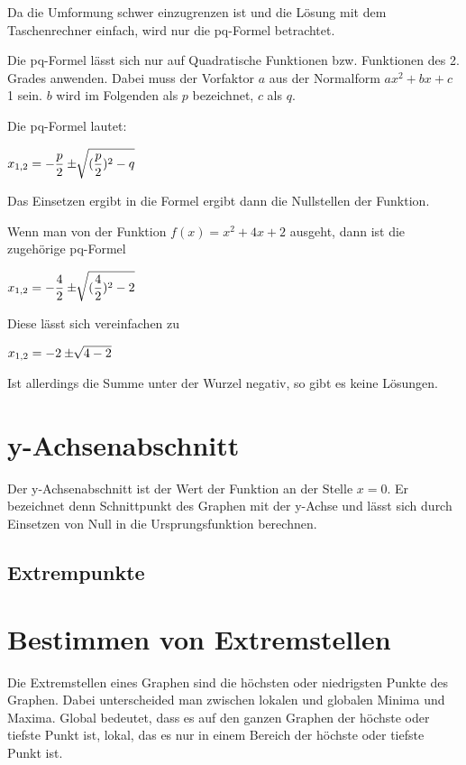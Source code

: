 Da die Umformung schwer einzugrenzen ist und die Lösung mit dem Taschenrechner einfach, wird nur die pq-Formel betrachtet.

Die pq-Formel lässt sich nur auf Quadratische Funktionen bzw. Funktionen des 2. Grades anwenden.
Dabei muss der Vorfaktor $a$ aus der Normalform $ax^2 + bx + c$ 1 sein.
$b$ wird im Folgenden als $p$ bezeichnet, $c$ als $q$.

Die pq-Formel lautet: \newline

$\mathlarger{x_{1,2} = -\frac{p}{2} \pm \sqrt[]{(\frac{p}{2})^2 - q}}$ \newline

Das Einsetzen ergibt in die Formel ergibt dann die Nullstellen der Funktion.

Wenn man von der Funktion $f(x) = x^2 + 4x + 2$ ausgeht, dann ist die zugehörige pq-Formel \newline

$\mathlarger{x_{1,2} = -\frac{4}{2} \pm \sqrt[]{(\frac{4}{2})^2 - 2}}$ \newline

Diese lässt sich vereinfachen zu \newline

$\mathlarger{x_{1,2} = -2 \pm \sqrt[]{4 - 2}}$

Ist allerdings die Summe unter der Wurzel negativ, so gibt es keine Lösungen.

\section*{y-Achsenabschnitt}

Der y-Achsenabschnitt ist der Wert der Funktion an der Stelle $x = 0$.
Er bezeichnet denn Schnittpunkt des Graphen mit der y-Achse und lässt sich
durch Einsetzen von Null in die Ursprungsfunktion berechnen. 

\subsection{Extrempunkte}

\section*{Bestimmen von Extremstellen}
Die Extremstellen eines Graphen sind die höchsten oder niedrigsten Punkte des Graphen.
Dabei unterscheided man zwischen lokalen und globalen Minima und Maxima. Global bedeutet,
dass es auf den ganzen Graphen der höchste oder tiefste Punkt ist, lokal, das es nur in einem Bereich
der höchste oder tiefste Punkt ist.
\newline

